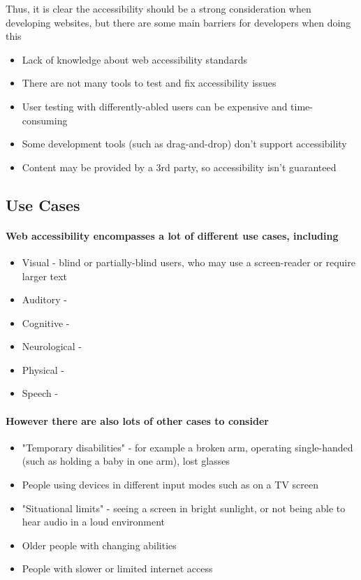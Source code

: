 \documentclass{article}
\begin{document}
Thus, it is clear the accessibility should be a strong consideration when developing websites, but there are some main barriers for developers when doing this

\begin{itemize}
    \item Lack of knowledge about web accessibility standards
    \item There are not many tools to test and fix accessibility issues
    \item User testing with differently-abled users can be expensive and time-consuming
    \item Some development tools (such as drag-and-drop) don't support accessibility
    \item Content may be provided by a 3rd party, so accessibility isn't guaranteed
\end{itemize}

\subsection{Use Cases}

\paragraph{Web accessibility encompasses a lot of different use cases, including}

\begin{itemize}
    \item Visual - blind or partially-blind users, who may use a screen-reader or require larger text
    \item Auditory - 
    \item Cognitive - 
    \item Neurological - 
    \item Physical - 
    \item Speech - 
\end{itemize}

\paragraph{However there are also lots of other cases to consider \cite{WAIaccessibilityintro}}

\begin{itemize}
    \item "Temporary disabilities" - for example a broken arm, operating single-handed (such as holding a baby in one arm), lost glasses
    \item People using devices in different input modes such as on a TV screen
    \item "Situational limits" - seeing a screen in bright sunlight, or not being able to hear audio in a loud environment
    \item Older people with changing abilities
    \item People with slower or limited internet access
\end{itemize}
\end{document}
